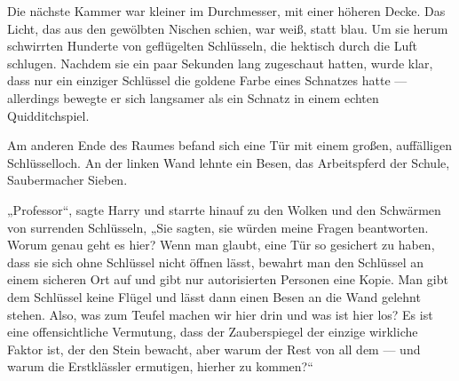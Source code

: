 Die nächste Kammer war kleiner im Durchmesser, mit einer höheren Decke. Das Licht, das aus den gewölbten Nischen schien, war weiß, statt blau.
Um sie herum schwirrten Hunderte von geflügelten Schlüsseln, die hektisch durch die Luft schlugen. Nachdem sie ein paar Sekunden lang zugeschaut hatten, wurde klar, dass nur ein einziger Schlüssel die goldene Farbe eines Schnatzes hatte — allerdings bewegte er sich langsamer als ein Schnatz in einem echten Quidditchspiel.

Am anderen Ende des Raumes befand sich eine Tür mit einem großen, auffälligen Schlüsselloch.
An der linken Wand lehnte ein Besen, das Arbeitspferd der Schule, Saubermacher Sieben.

„Professor“, sagte Harry und starrte hinauf zu den Wolken und den Schwärmen von surrenden Schlüsseln,
„Sie sagten, sie würden meine Fragen beantworten. Worum genau geht es hier? Wenn man glaubt, eine Tür so gesichert zu haben, dass sie sich ohne Schlüssel nicht öffnen lässt, bewahrt man den Schlüssel an einem sicheren Ort auf und gibt nur autorisierten Personen eine Kopie. Man gibt dem Schlüssel keine Flügel und lässt dann einen Besen an die Wand gelehnt stehen. Also, was zum Teufel machen wir hier drin und was ist hier los? Es ist eine offensichtliche Vermutung, dass der Zauberspiegel der einzige wirkliche Faktor ist, der den Stein bewacht, aber warum der Rest von all dem — und warum die Erstklässler ermutigen, hierher zu kommen?“


